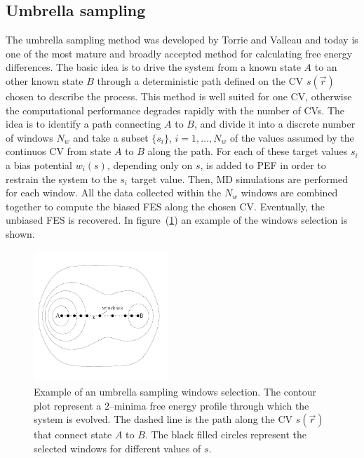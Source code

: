 \subsection{Umbrella sampling}
The umbrella sampling method was developed by Torrie and Valleau and today is one of the most mature and broadly
accepted method for calculating free energy differences. The basic idea is to drive the system from a known state
$A$ to an other known state $B$ through a deterministic path defined on the \ac{CV} $s(\vec r)$ chosen to
describe the process. This method is well suited for one \ac{CV}, otherwise the computational performance
degrades rapidly with the number of \acp{CV}. The idea is to identify a path connecting $A$ to $B$, and divide it
into a discrete number of windows $N_w$ and take a subset $\{s_i\}$, $i=1,\dots,N_w$ of the values assumed by the
continuos \ac{CV} from state $A$ to $B$ along the path. For each of these target values $s_i$ a bias potential
$w_i(s)$, depending only on $s$, is added to \ac{PEF} in order to restrain the system to the $s_i$ target value.
Then, \ac{MD} simulations are performed for each window. All the data collected within the $N_w$ windows are
combined together to compute the biased \ac{FES} along the chosen \ac{CV}. Eventually, the unbiased \ac{FES} is
recovered. In figure~(\ref{fig:umbrellaPath}) an example of the windows selection is shown.
\begin{figure}
	\centering
	\includegraphics[width=0.45\textwidth]{./img/umbrellaPath/umbrellaPath.pdf}
	\caption{Example of an umbrella sampling windows selection. The contour plot represent a $2$--minima free energy profile through which the system is evolved. The dashed line is the path along the \acs{CV} $s(\vec r)$ that connect state $A$ to $B$. The black filled circles represent the selected windows for different values of $s$.}%
	\label{fig:umbrellaPath}
\end{figure}

